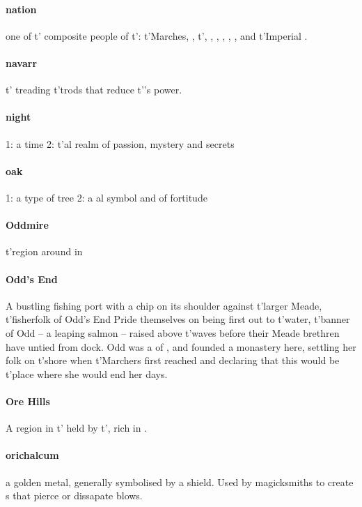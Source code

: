 \paragraph{nation} one of t' composite people of t'\allowbreak {}: t'\allowbreak Marches, , t'\allowbreak {}, , , , , ,  and t'\allowbreak Im\-pe\-ri\-al .
\paragraph{navarr} t'\allowbreak {} treading t'\allowbreak trods that reduce t'\allowbreak {}'s power.
\paragraph{night} 1: a time 2: t'\allowbreak {}al realm of passion, mystery and secrets
\paragraph{oak} 1: a type of tree 2: a al symbol and  of fortitude
\paragraph{Oddmire} t'\allowbreak region around  in 
\paragraph{Odd's End} A bustling fishing port with a chip on its shoulder against t'\allowbreak larger Meade, t'\allowbreak fisherfolk of Odd's End Pride themselves on being first out to t'\allowbreak water, t'\allowbreak banner of Odd – a leaping salmon – raised above t'\allowbreak waves before their Meade brethren have untied from dock. Odd was a  of , and founded a monastery here, settling her folk on t'\allowbreak shore when t'\allowbreak Marchers first reached  and declaring that this would be t'\allowbreak place where she would end her days. 
\paragraph{Ore Hills} A region in t'\allowbreak {} held by t'\allowbreak {}, rich in .
\paragraph{orichalcum} a golden metal, generally symbolised by a shield. Used by magicksmiths to create s that pierce or dissapate blows.
